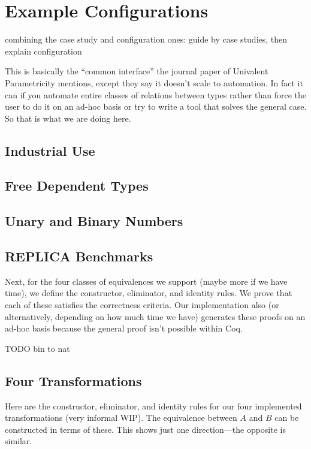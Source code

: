 \section{Example Configurations}
\label{sec:search}

combining the case study and configuration ones: guide by case studies, then explain configuration

This is basically the ``common interface'' the journal paper of Univalent Parametricity mentions, except they say it
doesn't scale to automation. In fact it can if you automate entire classes of relations between types rather than
force the user to do it on an ad-hoc basis or try to write a tool that solves the general case. So that is what
we are doing here.

\subsection{Industrial Use}

\subsection{Free Dependent Types}

\subsection{Unary and Binary Numbers}

\subsection{REPLICA Benchmarks}

Next, for the four classes of equivalences we support (maybe more if we have time), we define the constructor, eliminator, and identity rules.
We prove that each of these satisfies the correctness criteria.
Our implementation also (or alternatively, depending on how much time we have) generates these proofs on an ad-hoc basis because
the general proof isn't possible within Coq.

TODO bin to nat


\subsection{Four Transformations}


Here are the constructor, eliminator, and identity rules for our four implemented transformations (very informal WIP).
The equivalence between $A$ and $B$ can be constructed in terms of these.
This shows just one direction---the opposite is similar.

